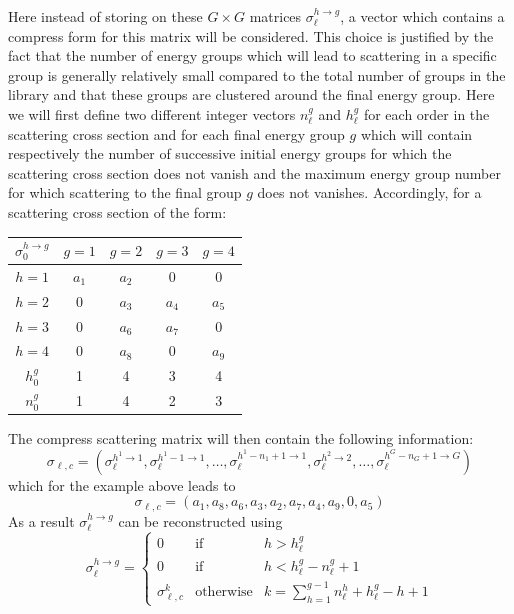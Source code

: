\vskip 0.2cm

Here instead of storing on these $G\times G$
matrices $\sigma_{\ell}^{h\to g}$, a vector which contains a compress form for this
matrix will be considered. This choice is justified by the fact that the number
of energy groups which will lead to scattering in a specific group is generally
relatively small compared to the total number of groups in the library and that
these groups are clustered around the final energy group.
Here we will first define two different integer vectors $n_{\ell}^{g}$ and
$h_{\ell}^{g}$ for each order in the scattering cross section and for each final
energy group $g$ which will contain respectively the number of
successive initial energy groups for which the scattering cross section does
not vanish and the maximum energy group number for which scattering to the
final group $g$ does not vanishes. Accordingly, for a scattering cross section
of the form:

\begin{center}
\begin{tabular}{c||cccc}
$\sigma_{0}^{h\to g}$ &$g=1$   & $g=2$   & $g=3$   & $g=4$    \\ \hline\hline
$h=1$                 & $a_{1}$ & $a_{2}$ & 0       & 0        \\
$h=2$                 & 0       & $a_{3}$ & $a_{4}$ & $a_{5}$  \\
$h=3$                 & 0       & $a_{6}$ & $a_{7}$ & 0        \\
$h=4$                 & 0       & $a_{8}$ & 0       & $a_{9}$  \\ \hline\hline
$h_{0}^{g}$           & 1       & 4       & 3       & 4       \\
$n_{0}^{g}$           & 1       & 4       & 2       & 3        \\
\end{tabular}
\end{center}

The compress scattering matrix will then contain the following information:
  \begin{displaymath}
    \sigma_{\ell,c}=\left(\sigma_{\ell}^{h^{1}\to 1},\sigma_{\ell}^{h^{1}-1\to 1},
    \ldots,\sigma_{\ell}^{h^{1}-n_{1}+1\to 1},\sigma_{\ell}^{h^{2}\to
    2},\ldots,\sigma_{\ell}^{h^{G}-n_{G}+1\to G}\right)
  \end{displaymath}
which for the example above leads to
  \begin{displaymath}
    \sigma_{\ell,c}=\left(a_{1},a_{8},a_{6},
                     a_{3},a_{2},a_{7},a_{4},a_{9},0,a_{5}\right)
  \end{displaymath}
As a result $\sigma_{\ell}^{h\to g}$ can be
reconstructed using 
\begin{displaymath}
\sigma_{\ell}^{h\to g} = \left\{
\begin{array}{lll}
0 & \textrm{if} & h > h_{\ell}^{g}\\
0 & \textrm{if} & h < h_{\ell}^{g}-n_{\ell}^{g}+1\\
\sigma_{\ell,c}^{k} & \textrm{otherwise} & k=\sum_{h=1}^{g-1} n_{\ell}^{h} +
h_{\ell}^{g}-h+1
\end{array} \right.
\end{displaymath}

